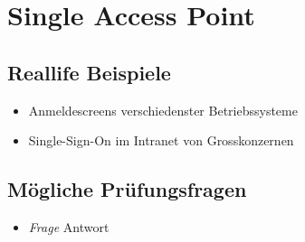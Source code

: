 \section{Single Access Point}

\subsection*{Reallife Beispiele}
\begin{itemize}
	\item Anmeldescreens verschiedenster Betriebssysteme
	\item Single-Sign-On im Intranet von Grosskonzernen
\end{itemize}

\subsection*{Mögliche Prüfungsfragen}
\begin{itemize}
	\item \emph{Frage}
	Antwort
\end{itemize}
